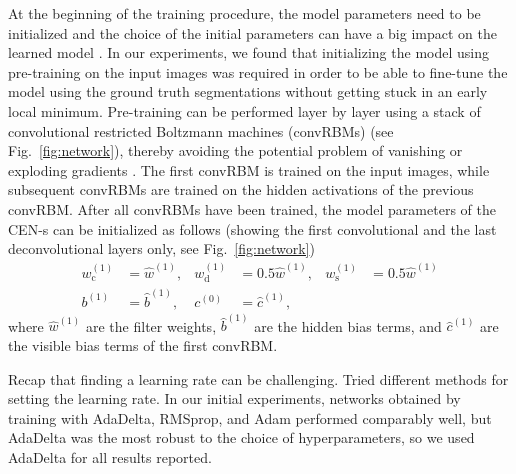 At the beginning of the training procedure, the model parameters need to be
initialized and the choice of the initial parameters can have a big impact on
the learned model \cite{sutskever2013}. In our experiments, we found that
initializing the model using pre-training \cite{hinton2006c} on the input images
was required in order to be able to fine-tune the model using the ground truth
segmentations without getting stuck in an early local minimum. Pre-training can
be performed layer by layer \cite{Hinton2006b} using a stack of convolutional
restricted Boltzmann machines (convRBMs) \cite{lee2009} (see
Fig.~\ref{fig:network}), thereby avoiding the potential problem of vanishing or
exploding gradients \cite{hochreiter1991}. The first convRBM is trained on the
input images, while subsequent convRBMs are trained on the hidden activations of
the previous convRBM. After all convRBMs have been trained, the model parameters
of the CEN-s can be initialized as follows (showing the first convolutional and
the last deconvolutional layers only, see Fig.~\ref{fig:network})
\begin{align}
w_{\text{c}}^{(1)} &= \hat{w}^{(1)}, &
w_{\text{d}}^{(1)} &= 0.5\hat{w}^{(1)}, &
w_{\text{s}}^{(1)} &= 0.5\hat{w}^{(1)} \\
b^{(1)} &= \hat{b}^{(1)}, &
c^{(0)} &= \hat{c}^{(1)},
\end{align}
where $\hat{w}^{(1)}$ are the filter weights, $\hat{b}^{(1)}$ are the hidden
bias terms, and $\hat{c}^{(1)}$ are the visible bias terms of the first convRBM.

Recap that finding a learning rate can be challenging. Tried different methods
for setting the learning rate. In our initial experiments, networks obtained by
training with AdaDelta, RMSprop, and Adam performed comparably well, but
AdaDelta was the most robust to the choice of hyperparameters, so we used
AdaDelta for all results reported.

